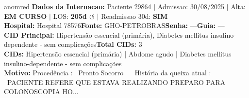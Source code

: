 \documentclass[a4paper,10pt]{article}
\begin{document}
\begin{anomalycard}[Internacao 145780 | GHO-PETROBRAS | CRITICO (z=6.04)]{anomred}
\textbf{Dados da Internacao:} Paciente 29864 $\mid$ Admissao: 30/08/2025 $\mid$ Alta: \textcolor{anomorange}{\textbf{EM CURSO}} $\mid$ LOS: \textbf{205d \textcolor{anomorange}{$\circlearrowleft$}} $\mid$ Readmissao 30d: \textcolor{anomred}{\textbf{SIM}}\\
\textbf{Hospital:} Hospital 78576\quad\textbf{Fonte:} GHO-PETROBRAS\quad\textbf{Senha:} ---\quad\textbf{Guia:} ---\\
\textbf{CID Principal:} {\small Hipertensão essencial (primária), Diabetes mellitus insulino-dependente - sem complicações}\quad\textbf{Total CIDs:} 3\\

\textbf{CIDs:} {\scriptsize Hipertensão essencial (primária) | Abdome agudo | Diabetes mellitus insulino-dependente - sem complicações}\\

\textbf{Motivo:} {\scriptsize Procedência :  Pronto Socorro     História da queixa atual :  PACIENTE REFERE QUE ESTAVA REALIZANDO PREPARO PARA COLONOSCOPIA HO...}\\


\end{anomalycard}
\end{document}
